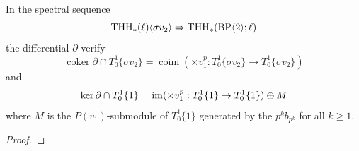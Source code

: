 \begin{proposition}
  In the spectral sequence
  \begin{equation}
    \operatorname{THH}_*(\ell) \langle \sigma v_2 \rangle \Rightarrow \operatorname{THH}_*(\mathrm{BP} \langle 2 \rangle; \ell)
  \end{equation}
  the differential $\partial$ verify
  \begin{equation}
    \operatorname{coker} \partial \cap T_0^1\{\sigma v_2 \} = \operatorname{coim}(\times v_1^p : T_0^1\{\sigma v_2 \} \rightarrow T_0^1\{\sigma v_2 \})
  \end{equation}
  and
  \begin{equation}
    \ker \partial \cap T_0^1\{ 1 \} =  \operatorname{im} (\times v_1^p : T_0^1\{ 1 \} \rightarrow T_0^1\{ 1 \}) \oplus M
  \end{equation}
  where $M$ is the $P(v_1)$-submodule of $T_0^1\{ 1 \}$ generated by the $p^{k}b_{p^k}$ for all $k \geq 1$.
\end{proposition}

\begin{proof}

\end{proof}




